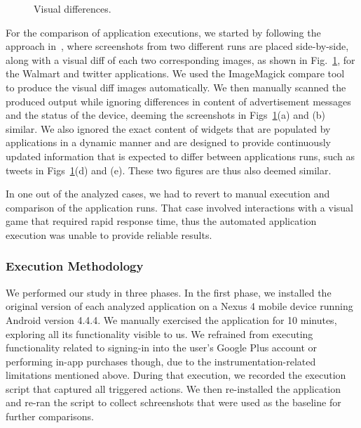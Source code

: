 \begin{figure}[!t]
{    }%
%
    \vspace{-0.1in}
    \caption{Visual differences.}
       \vspace{-0.1in}
    \label{fig:screenshots}
    \vspace{-0.1in}
\end{figure}

For the comparison of application executions, we started by following the approach in~\cite{Hornyack:Han:Jung:Schechter:Wetherall:CCS11}, where screenshots from two different runs are placed side-by-side, 
along with a visual diff of each two corresponding images, as shown in Fig.~\ref{fig:screenshots}, for 
the Walmart and twitter applications. 
We used the ImageMagick compare tool~\cite{imagemagick}
to produce the visual diff images automatically. 
We then manually scanned the produced output while ignoring differences in content of advertisement messages and the status of the device, deeming the screenshots in Figs~\ref{fig:screenshots}(a) and (b) similar. 
We also ignored the exact content of widgets that are populated by applications in a dynamic manner and are designed to 
provide continuously updated information that is expected to differ between applications runs, such as tweets in Figs~\ref{fig:screenshots}(d) and (e). These two figures are thus also deemed similar.

In one out of the analyzed cases, we had to revert to manual execution and comparison of the application runs.
That case involved interactions with a visual game that required rapid response time, 
thus the automated application execution was unable to provide reliable results. 


\subsubsection{Execution Methodology}
We performed our study in three phases. In the first phase, 
we installed the original version of each analyzed 
application on a Nexus 4 mobile device running Android version 4.4.4.
We manually exercised the application for 10 minutes, exploring all its functionality visible to us. We refrained from executing functionality related to signing-in into the user's Google Plus account or performing in-app purchases though, due to the instrumentation-related limitations mentioned above.
During that execution, we recorded the execution script that captured all triggered actions. 
We then re-installed the application %
and re-ran the script to collect schreenshots that were used as the baseline for further comparisons. 

